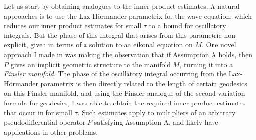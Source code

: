 \documentclass[11pt]{article}
\DeclareMathOperator{\RR}{\mathbb{R}}
\begin{document}


Let us start by obtaining analogues to the inner product estimates. A natural approaches is to use the Lax-H\"{o}rmander parametrix for the wave equation, which reduces our inner product estimates for small $\tau$ to a bound for oscillatory integrals. But the phase of this integral that arises from this parametric non-explicit, given in terms of a solution to an eikonal equation on $M$. One novel approach I made in \cite{DensonCharacterization} was making the observation that if Assumption A holds, then $P$ gives an implicit geometric structure to the manifold $M$, turning it into a \emph{Finsler manifold}. %
The phase of the oscillatory integral occurring from the Lax-H\"{o}rmander parametrix is then directly related to the length of certain geodesics on this Finsler manifold, and using the Finsler analogue of the second variation formula for geodesics, I was able to obtain the required inner product estimates that occur in \cite{HeoNazarovSeeger} for small $\tau$. Such estimates apply to multipliers of an arbitrary pseudodifferential operator $P$ satisfying Assumption A, and likely have applications in other problems.
\end{document}
